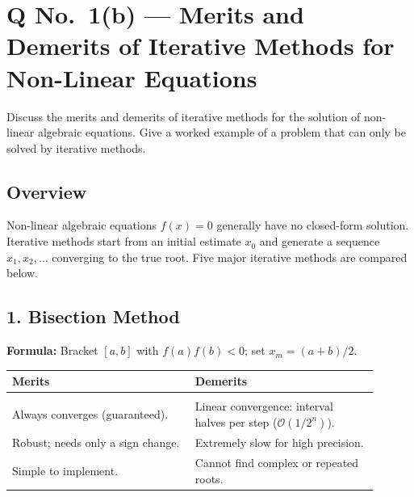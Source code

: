 \documentclass[12pt]{article}
\begin{document}
\newpage

\section{Q No.\ 1(b) --- Merits and Demerits of Iterative Methods for Non-Linear Equations}

\begin{problembox}
Discuss the merits and demerits of iterative methods for the solution of non-linear algebraic equations. Give a worked example of a problem that can only be solved by iterative methods.
\end{problembox}

\subsection*{Overview}

\begin{conceptbox}
Non-linear algebraic equations $f(x)=0$ generally have no closed-form solution. Iterative methods start from an initial estimate $x_0$ and generate a sequence $x_1, x_2, \ldots$ converging to the true root. Five major iterative methods are compared below.
\end{conceptbox}

\vspace{6pt}

\subsection*{1. Bisection Method}

\textbf{Formula:} Bracket $[a,b]$ with $f(a)f(b)<0$; set $x_m = (a+b)/2$.

\begin{observebox}
\begin{tabular}{p{0.45\linewidth} p{0.45\linewidth}}
\textbf{Merits} & \textbf{Demerits} \\[2pt]
\hline\\[-6pt]
Always converges (guaranteed). & Linear convergence: interval halves per step ($\mathcal{O}(1/2^n)$). \\
Robust; needs only a sign change. & Extremely slow for high precision. \\
Simple to implement. & Cannot find complex or repeated roots. \\
\end{tabular}
\end{observebox}
\end{document}
